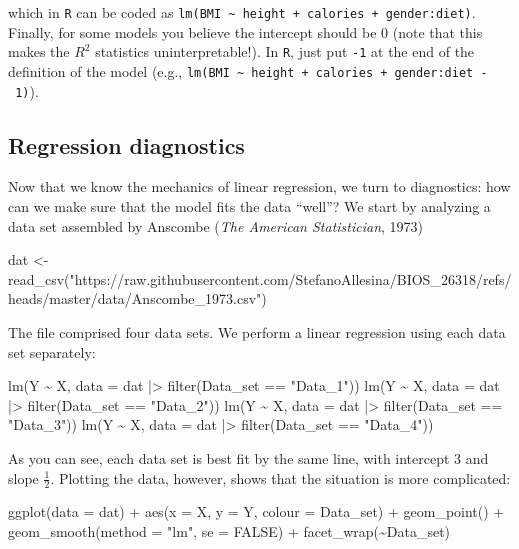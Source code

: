 \documentclass[
  letterpaper,
  DIV=11,
  numbers=noendperiod]{scrreprt}
\newenvironment{Shaded}{\begin{snugshade}}{\end{snugshade}}
\newcommand{\NormalTok}[1]{\textcolor[rgb]{0.00,0.23,0.31}{#1}}
\begin{document}
which in \texttt{R} can be coded as
\texttt{lm(BMI\ \textasciitilde{}\ height\ +\ calories\ +\ gender:diet)}.
Finally, for some models you believe the intercept should be 0 (note
that this makes the \(R^2\) statistics uninterpretable!). In \texttt{R},
just put \texttt{-1} at the end of the definition of the model (e.g.,
\texttt{lm(BMI\ \textasciitilde{}\ height\ +\ calories\ +\ gender:diet\ -\ 1)}).

\subsection{Regression diagnostics}\label{regression-diagnostics}

Now that we know the mechanics of linear regression, we turn to
diagnostics: how can we make sure that the model fits the data ``well''?
We start by analyzing a data set assembled by Anscombe (\emph{The
American Statistician}, 1973)

\begin{Shaded}
\begin{Highlighting}[]
\NormalTok{dat \textless{}{-} read\_csv("https://raw.githubusercontent.com/StefanoAllesina/BIOS\_26318/refs/heads/master/data/Anscombe\_1973.csv")}
\end{Highlighting}
\end{Shaded}

The file comprised four data sets. We perform a linear regression using
each data set separately:

\begin{Shaded}
\begin{Highlighting}[]
\NormalTok{lm(Y \textasciitilde{} X, data = dat |\textgreater{} filter(Data\_set == "Data\_1"))}
\NormalTok{lm(Y \textasciitilde{} X, data = dat |\textgreater{} filter(Data\_set == "Data\_2"))}
\NormalTok{lm(Y \textasciitilde{} X, data = dat |\textgreater{} filter(Data\_set == "Data\_3"))}
\NormalTok{lm(Y \textasciitilde{} X, data = dat |\textgreater{} filter(Data\_set == "Data\_4"))}
\end{Highlighting}
\end{Shaded}

As you can see, each data set is best fit by the same line, with
intercept 3 and slope \(\frac{1}{2}\). Plotting the data, however, shows
that the situation is more complicated:

\begin{Shaded}
\begin{Highlighting}[]
\NormalTok{ggplot(data = dat) + aes(x = X, y = Y, colour = Data\_set) + }
\NormalTok{  geom\_point() + geom\_smooth(method = "lm", se = FALSE) + }
\NormalTok{  facet\_wrap(\textasciitilde{}Data\_set)}
\end{Highlighting}
\end{Shaded}
\end{document}
